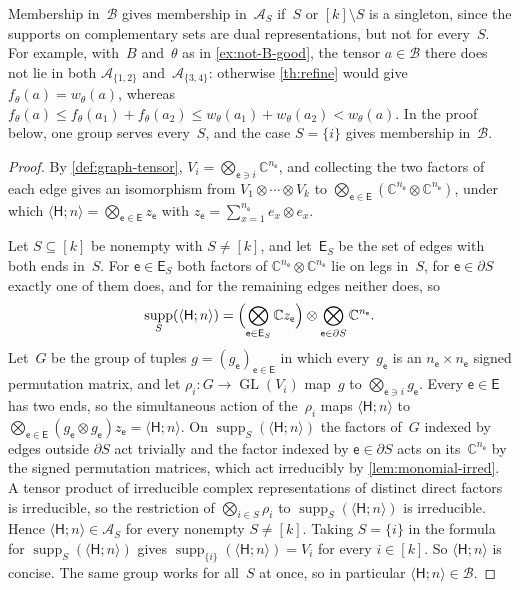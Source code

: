 \documentclass[11pt,letterpaper]{article}
\DeclareMathOperator{\supp}{supp}
\newcommand{\CC}{\mathbb{C}}
\DeclareMathOperator{\GL}{GL}
\begin{document}
Membership in~$\mathcal{B}$ gives membership in~$\mathcal{A}_S$ if~$S$ or $[k] \setminus S$ is a singleton, since the supports on complementary sets are dual representations, but not for every~$S$. For example, with~$B$ and~$\theta$ as in \cref{ex:not-B-good}, the tensor $a \in \mathcal{B}$ there does not lie in both $\mathcal{A}_{\{1,2\}}$ and~$\mathcal{A}_{\{3,4\}}$: otherwise \cref{th:refine} would give $f_\theta(a) = w_\theta(a)$, whereas $f_\theta(a) \leq f_\theta(a_1) + f_\theta(a_2) \leq w_\theta(a_1) + w_\theta(a_2) < w_\theta(a)$. In the proof below, one group serves every~$S$, and the case $S = \{i\}$ gives membership in~$\mathcal{B}$.
\begin{proof}
By \cref{def:graph-tensor}, $V_i = \bigotimes_{\mathsf{e} \ni i} \CC^{n_{\mathsf{e}}}$, and collecting the two factors of each edge gives an isomorphism from $V_1 \otimes \cdots \otimes V_k$ to $\bigotimes_{\mathsf{e} \in \mathsf{E}} (\CC^{n_{\mathsf{e}}} \otimes \CC^{n_{\mathsf{e}}})$, under which $\langle \mathsf{H}; n \rangle = \bigotimes_{\mathsf{e} \in \mathsf{E}} z_{\mathsf{e}}$ with $z_{\mathsf{e}} = \sum_{x=1}^{n_{\mathsf{e}}} e_x \otimes e_x$.

Let $S \subseteq [k]$ be nonempty with $S \neq [k]$, and let~$\mathsf{E}_S$ be the set of edges with both ends in~$S$. For $\mathsf{e} \in \mathsf{E}_S$ both factors of $\CC^{n_{\mathsf{e}}} \otimes \CC^{n_{\mathsf{e}}}$ lie on legs in~$S$, for $\mathsf{e} \in \partial S$ exactly one of them does, and for the remaining edges neither does, so
\[
\supp_S(\langle \mathsf{H}; n \rangle) = \Bigl( \bigotimes_{\mathsf{e} \in \mathsf{E}_S} \CC z_{\mathsf{e}} \Bigr) \otimes \bigotimes_{\mathsf{e} \in \partial S} \CC^{n_{\mathsf{e}}}.
\]
Let~$G$ be the group of tuples $g = (g_{\mathsf{e}})_{\mathsf{e} \in \mathsf{E}}$ in which every~$g_{\mathsf{e}}$ is an $n_{\mathsf{e}} \times n_{\mathsf{e}}$ signed permutation matrix, and let $\rho_i : G \to \GL(V_i)$ map~$g$ to $\bigotimes_{\mathsf{e} \ni i} g_{\mathsf{e}}$. Every $\mathsf{e} \in \mathsf{E}$ has two ends, so the simultaneous action of the~$\rho_i$ maps $\langle \mathsf{H}; n \rangle$ to $\bigotimes_{\mathsf{e} \in \mathsf{E}} (g_{\mathsf{e}} \otimes g_{\mathsf{e}}) z_{\mathsf{e}} = \langle \mathsf{H}; n \rangle$. On $\supp_S(\langle \mathsf{H}; n \rangle)$ the factors of~$G$ indexed by edges outside $\partial S$ act trivially and the factor indexed by $\mathsf{e} \in \partial S$ acts on its~$\CC^{n_{\mathsf{e}}}$ by the signed permutation matrices, which act irreducibly by \cref{lem:monomial-irred}. A tensor product of irreducible complex representations of distinct direct factors is irreducible, so the restriction of $\bigotimes_{i \in S} \rho_i$ to $\supp_S(\langle \mathsf{H}; n \rangle)$ is irreducible. Hence $\langle \mathsf{H}; n \rangle \in \mathcal{A}_S$ for every nonempty $S \neq [k]$. Taking $S = \{i\}$ in the formula for $\supp_S(\langle \mathsf{H}; n \rangle)$ gives $\supp_{\{i\}}(\langle \mathsf{H}; n \rangle) = V_i$ for every $i \in [k]$. So $\langle \mathsf{H}; n \rangle$ is concise. The same group works for all~$S$ at once, so in particular $\langle \mathsf{H}; n \rangle \in \mathcal{B}$.
\end{proof}
\end{document}
